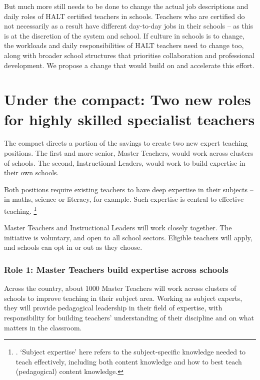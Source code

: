 \documentclass{grattan}
\begin{document}
But much more still needs to be done to change the actual job descriptions and daily roles of HALT certified teachers in schools. Teachers who are certified do not necessarily as a result have different day-to-day jobs in their schools -- as this is at the discretion of the system and school. If culture in schools is to change, the workloads and daily responsibilities of HALT teachers need to change too, along with broader school structures that prioritise collaboration and professional development.
We propose a change that would build on and accelerate this effort.

\section{Under the compact: Two new roles for highly skilled specialist teachers}\label{sec:under-the-compact-two-new-roles-for-highly-skilled-specialist-teachers}

The compact directs a portion of the savings to create two new expert teaching positions.
The first and more senior, Master Teachers, would work across clusters of schools.
The second, Instructional Leaders, would work to build expertise in their own schools.

Both positions require existing teachers to have deep expertise in their subjects -- in maths, science or literacy, for example.
Such expertise is central to effective teaching.%
\footnote{\textcites{Allen2003EightQuestionsTeacher}{Coe2014WhatMakesGreat}{Hill2005EffectsTeachersMathematical}{NationalRCouncil2010soundpolicy}. `Subject expertise' here refers to the subject-specific knowledge needed to teach effectively, including both content knowledge and how to best teach (pedagogical) content knowledge.}

Master Teachers and Instructional Leaders will work closely together.
The initiative is voluntary, and  open to all school sectors. Eligible teachers will apply, and schools can opt in or out as they choose.

\subsubsection{Role 1: Master Teachers build expertise across schools}\label{subsubsec:role-1-master-teachers-who-work-across-schools}

Across the country, about 1000 Master Teachers will work across clusters of schools to improve teaching in their subject area.
Working as subject experts, they will provide pedagogical leadership in their field of expertise, with responsibility for building teachers' understanding of their discipline and on what matters in the classroom.
\end{document}
